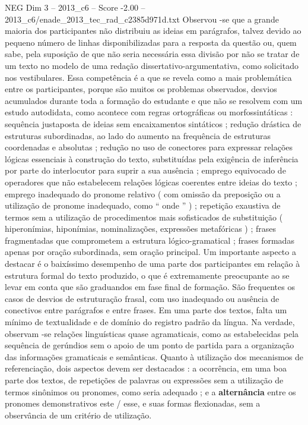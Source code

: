 \begin{textsample}{NEG Dim 3 – 2013\_c6 – Score -2.00 – 2013\_c6/enade\_2013\_tec\_rad\_c2385d971d.txt}
Observou -se que a grande maioria dos participantes não distribuiu as ideias em parágrafos, talvez devido ao pequeno número de linhas disponibilizadas para a resposta da questão ou, quem sabe, pela suposição de que não seria necessária essa divisão por não se tratar de um texto no modelo de uma redação dissertativo-argumentativa, como solicitado nos vestibulares.
Essa competência é a que se revela como a mais problemática entre os participantes, porque são muitos os problemas observados, desvios acumulados durante toda a formação do estudante e que não se resolvem com um estudo autodidata, como acontece com regras ortográficas ou morfossintáticas : sequência justaposta de ideias sem encaixamentos sintáticos ; redução drástica de estruturas subordinadas, ao lado do aumento na frequência de estruturas coordenadas e absolutas ; redução no uso de conectores para expressar relações lógicas essenciais à construção do texto, substituídas pela exigência de inferência por parte do interlocutor para suprir a sua ausência ; emprego equivocado de operadores que não estabelecem relações lógicas coerentes entre ideias do texto ; emprego inadequado do pronome relativo ( com omissão da preposição ou a utilização de pronome inadequado, como “ onde ” ) ; repetição exaustiva de termos sem a utilização de procedimentos mais sofisticados de substituição ( hiperonímias, hiponímias, nominalizações, expressões metafóricas ) ; frases fragmentadas que comprometem a estrutura lógico-gramatical ; frases formadas apenas por oração subordinada, sem oração principal.
Um importante aspecto a destacar é o baixíssimo desempenho de uma parte dos participantes em relação à estrutura formal do texto produzido, o que é extremamente preocupante ao se levar em conta que são graduandos em fase final de formação.
São frequentes os casos de desvios de estruturação frasal, com uso inadequado ou ausência de conectivos entre parágrafos e entre frases.
Em uma parte dos textos, falta um mínimo de textualidade e de domínio do registro padrão da língua.
Na verdade, observam -se relações linguísticas quase agramaticais, como as estabelecidas pela sequência de gerúndios sem o apoio de um ponto de partida para a organização das informações gramaticais e semânticas.
Quanto à utilização dos mecanismos de referenciação, dois aspectos devem ser destacados : a ocorrência, em uma boa parte dos textos, de repetições de palavras ou expressões sem a utilização de termos sinônimos ou pronomes, como seria adequado ; e a \textbf{alternância} entre os pronomes demonstrativos este / esse, e suas formas flexionadas, sem a observância de um critério de utilização.

\end{textsample}
